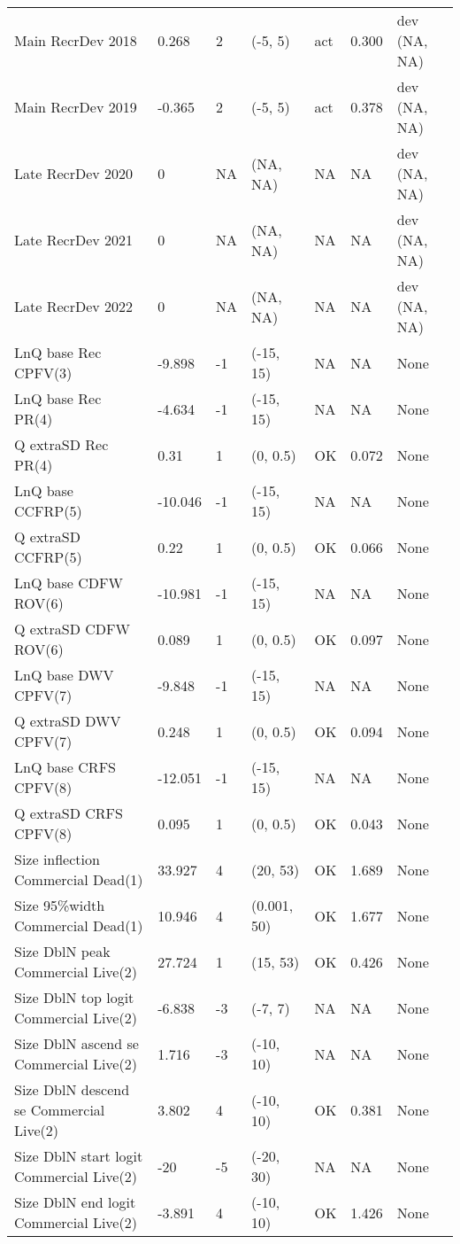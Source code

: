 \documentclass[11pt,
  english,
  letterpaper,
]{article}
\begin{document}
\begin{landscape}
\begin{longtable}[t]{>{\raggedright\arraybackslash}p{7.5cm}lllll>{\raggedright\arraybackslash}p{3.5cm}}
Main RecrDev 2018 & 0.268 & 2 & (-5, 5) & act & 0.300 & dev (NA, NA)\\
Main RecrDev 2019 & -0.365 & 2 & (-5, 5) & act & 0.378 & dev (NA, NA)\\
Late RecrDev 2020 & 0 & NA & (NA, NA) & NA & NA & dev (NA, NA)\\
Late RecrDev 2021 & 0 & NA & (NA, NA) & NA & NA & dev (NA, NA)\\
Late RecrDev 2022 & 0 & NA & (NA, NA) & NA & NA & dev (NA, NA)\\
LnQ base Rec CPFV(3) & -9.898 & -1 & (-15, 15) & NA & NA & None\\
LnQ base Rec PR(4) & -4.634 & -1 & (-15, 15) & NA & NA & None\\
Q extraSD Rec PR(4) & 0.31 & 1 & (0, 0.5) & OK & 0.072 & None\\
LnQ base CCFRP(5) & -10.046 & -1 & (-15, 15) & NA & NA & None\\
Q extraSD CCFRP(5) & 0.22 & 1 & (0, 0.5) & OK & 0.066 & None\\
LnQ base CDFW ROV(6) & -10.981 & -1 & (-15, 15) & NA & NA & None\\
Q extraSD CDFW ROV(6) & 0.089 & 1 & (0, 0.5) & OK & 0.097 & None\\
LnQ base DWV CPFV(7) & -9.848 & -1 & (-15, 15) & NA & NA & None\\
Q extraSD DWV CPFV(7) & 0.248 & 1 & (0, 0.5) & OK & 0.094 & None\\
LnQ base CRFS CPFV(8) & -12.051 & -1 & (-15, 15) & NA & NA & None\\
Q extraSD CRFS CPFV(8) & 0.095 & 1 & (0, 0.5) & OK & 0.043 & None\\
Size inflection Commercial Dead(1) & 33.927 & 4 & (20, 53) & OK & 1.689 & None\\
Size 95\%width Commercial Dead(1) & 10.946 & 4 & (0.001, 50) & OK & 1.677 & None\\
Size DblN peak Commercial Live(2) & 27.724 & 1 & (15, 53) & OK & 0.426 & None\\
Size DblN top logit Commercial Live(2) & -6.838 & -3 & (-7, 7) & NA & NA & None\\
Size DblN ascend se Commercial Live(2) & 1.716 & -3 & (-10, 10) & NA & NA & None\\
Size DblN descend se Commercial Live(2) & 3.802 & 4 & (-10, 10) & OK & 0.381 & None\\
Size DblN start logit Commercial Live(2) & -20 & -5 & (-20, 30) & NA & NA & None\\
Size DblN end logit Commercial Live(2) & -3.891 & 4 & (-10, 10) & OK & 1.426 & None\\

\end{longtable}
\end{landscape}
\end{document}
